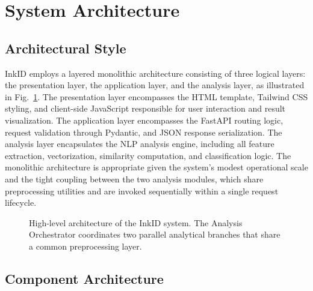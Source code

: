 \documentclass[conference]{IEEEtran}
\begin{document}
\section{System Architecture}
\label{sec:architecture}

\subsection{Architectural Style}

InkID employs a layered monolithic architecture consisting of three logical
layers: the presentation layer, the application layer, and the analysis layer,
as illustrated in Fig.~\ref{fig:arch}. The presentation layer encompasses the
HTML template, Tailwind CSS styling, and client-side JavaScript responsible for
user interaction and result visualization. The application layer encompasses
the FastAPI \cite{fastapi} routing logic, request validation through Pydantic,
and JSON response serialization. The analysis layer encapsulates the NLP
analysis engine, including all feature extraction, vectorization, similarity
computation, and classification logic. The monolithic architecture is
appropriate given the system's modest operational scale and the tight coupling
between the two analysis modules, which share preprocessing utilities and are
invoked sequentially within a single request lifecycle.

\begin{figure}[htbp]
  \centerline{%
  }
  \caption{High-level architecture of the InkID system. The Analysis
    Orchestrator coordinates two parallel analytical branches that share
    a common preprocessing layer.}
  \label{fig:arch}
\end{figure}

\subsection{Component Architecture}
\end{document}
